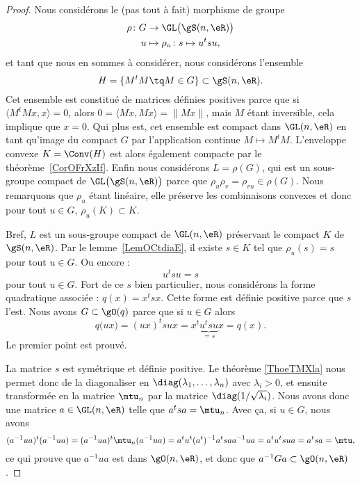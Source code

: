 \begin{proof}
	Nous considérons le (pas tout à fait) morphisme de groupe
	\begin{equation}
		\begin{aligned}
			\rho\colon G & \to \GL\big( \gS(n,\eR) \big)         \\
			u            & \mapsto \rho_u\colon s\mapsto  u^tsu,
		\end{aligned}
	\end{equation}
	et tant que nous en sommes à considérer, nous considérons l'ensemble
	\begin{equation}
		H=\{ M^tM\tq M\in G \}\subset \gS(n,\eR).
	\end{equation}
	Cet ensemble est constitué de matrices définies positives parce que si \( \langle M^tMx, x\rangle =0\), alors \(0= \langle Mx, Mx\rangle =\| Mx \|\), mais \( M\) étant inversible, cela implique que \( x=0\). Qui plus est, cet ensemble est compact dans \( \GL(n,\eR)\) en tant qu'image du compact \( G\) par l'application continue \( M\mapsto M^tM\). L'enveloppe convexe \( K=\Conv(H)\) est alors également compacte par le théorème~\ref{CorOFrXzIf}. Enfin nous considérons \( L=\rho(G)\), qui est un sous-groupe compact de \( \GL\big( \gS(n,\eR) \big)\) parce que \( \rho_u\rho_v=\rho_{vu}\in\rho(G)\). Nous remarquons que \( \rho_u\) étant linéaire, elle préserve les combinaisons convexes et donc pour tout \( u\in G\), \( \rho_u(K)\subset K\).

	Bref, \( L\) est un sous-groupe compact de \( \GL(n,\eR)\) préservant le compact \( K\) de \( \gS(n,\eR)\). Par le lemme~\ref{LemOCtdiaE}, il existe \( s\in K\) tel que \( \rho_u(s)=s\) pour tout \( u\in G\). Ou encore :
	\begin{equation}
		u^tsu=s
	\end{equation}
	pour tout \( u\in G\). Fort de ce \( s\) bien particulier, nous considérons la forme quadratique associée : \( q(x)=x^tsx\). Cette forme est définie positive parce que \( s\) l'est. Nous avons \( G\subset \gO(q)\) parce que si \( u\in G\) alors
	\begin{equation}
		q\big( ux \big)=(ux)^tsux=x^t\underbrace{u^tsu}_{=s}x=q(x).
	\end{equation}
	Le premier point est prouvé.

	La matrice \( s\) est symétrique et définie positive. Le théorème \ref{ThoeTMXla} nous permet donc de la diagonaliser en \( \diag(\lambda_1,\ldots, \lambda_n)\) avec \( \lambda_i>0\), et ensuite transformée en la matrice \( \mtu_n\) par la matrice \( \diag(1/\sqrt{\lambda_i})\). Nous avons donc une matrice \( a\in\GL(n,\eR)\) telle que \( a^tsa=\mtu_n\). Avec ça, si \( u\in G\), nous avons
	\begin{equation}
		(a^{-1}ua)^t(a^{-1} ua)=(a^{-1}ua)^t\mtu_n(a^{-1} ua)=a^tu^t(a^t)^{-1}a^tsaa^{-1}ua=a^tu^tsua=a^tsa=\mtu,
	\end{equation}
	ce qui prouve que \( a^{-1} ua\) est dans \( \gO(n,\eR)\), et donc que \( a^{-1} G a\subset \gO(n,\eR)\).
\end{proof}
